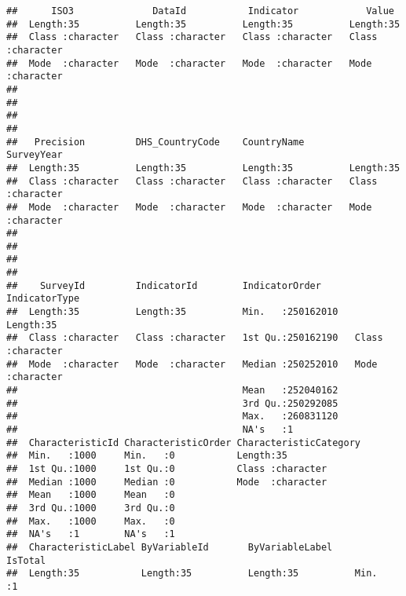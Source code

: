 \documentclass[
]{article}
\begin{document}
\begin{verbatim}
##      ISO3              DataId           Indicator            Value          
##  Length:35          Length:35          Length:35          Length:35         
##  Class :character   Class :character   Class :character   Class :character  
##  Mode  :character   Mode  :character   Mode  :character   Mode  :character  
##                                                                             
##                                                                             
##                                                                             
##                                                                             
##   Precision         DHS_CountryCode    CountryName         SurveyYear       
##  Length:35          Length:35          Length:35          Length:35         
##  Class :character   Class :character   Class :character   Class :character  
##  Mode  :character   Mode  :character   Mode  :character   Mode  :character  
##                                                                             
##                                                                             
##                                                                             
##                                                                             
##    SurveyId         IndicatorId        IndicatorOrder      IndicatorType     
##  Length:35          Length:35          Min.   :250162010   Length:35         
##  Class :character   Class :character   1st Qu.:250162190   Class :character  
##  Mode  :character   Mode  :character   Median :250252010   Mode  :character  
##                                        Mean   :252040162                     
##                                        3rd Qu.:250292085                     
##                                        Max.   :260831120                     
##                                        NA's   :1                             
##  CharacteristicId CharacteristicOrder CharacteristicCategory
##  Min.   :1000     Min.   :0           Length:35             
##  1st Qu.:1000     1st Qu.:0           Class :character      
##  Median :1000     Median :0           Mode  :character      
##  Mean   :1000     Mean   :0                                 
##  3rd Qu.:1000     3rd Qu.:0                                 
##  Max.   :1000     Max.   :0                                 
##  NA's   :1        NA's   :1                                 
##  CharacteristicLabel ByVariableId       ByVariableLabel       IsTotal 
##  Length:35           Length:35          Length:35          Min.   :1  

\end{verbatim}
\end{document}
